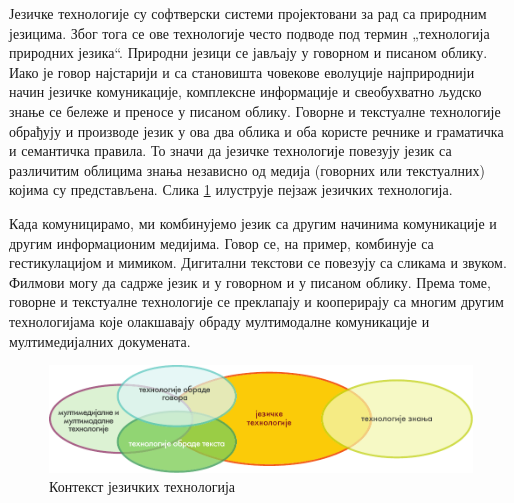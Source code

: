 \begin{multicols}{2}   


Језичке технологије су софтверски системи пројектовани за рад са природним језицима. Због тога се ове технологије често подводе под термин „технологија природних језика“. Природни језици се јављају у говорном и писаном облику. Иако је говор најстарији и са становишта човекове еволуције најприроднији начин језичке комуникације, комплексне информације и свеобухватно људско знање се бележе и преносе у писаном облику. Говорне и текстуалне технологије обрађују и производе језик у ова два облика и оба користе речнике и граматичка и семантичка правила. То значи да језичке технологије повезују језик са различитим облицима знања независно од медија (говорних или текстуалних) којима су представљена. Слика \ref{fig:ltincontext_sr} илуструје пејзаж језичких технологија. 

Када комуницирамо, ми комбинујемо језик са другим начинима комуникације и другим информационим медијима. Говор се, на пример, комбинује са гестикулацијом и мимиком. Дигитални текстови се повезују са сликама и звуком. Филмови могу да садрже језик и у говорном и у писаном облику. Према томе, говорне и текстуалне технологије се преклапају и кооперирају са многим другим технологијама које олакшавају обраду мултимодалне комуникације и мултимедијалних докумената. 

\begin{figure}[htb]
  \center
  \includegraphics[width=\textwidth]{../_media/serbian/language_technologies}
  \caption{Контекст језичких технологија}
  \label{fig:ltincontext_sr}
\end{figure}


\end{multicols}
